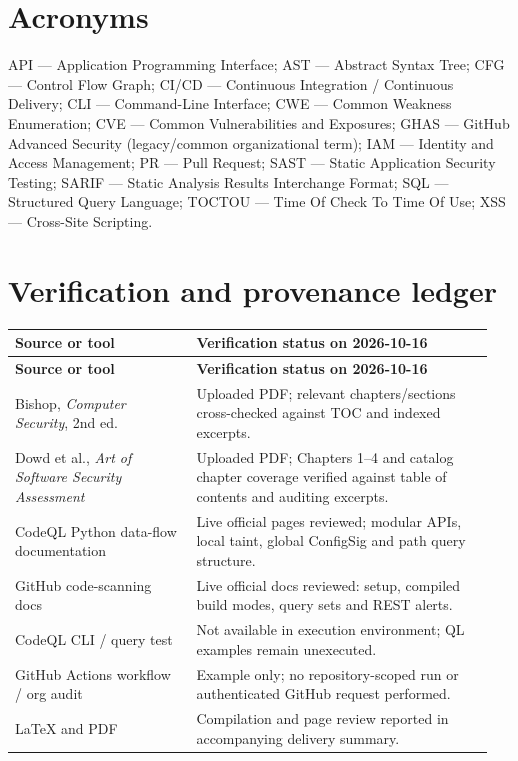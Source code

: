 \documentclass[11pt,letterpaper,oneside]{book}
\begin{document}
\section{Acronyms}

API --- Application Programming Interface; AST --- Abstract Syntax Tree; CFG --- Control Flow Graph; CI/CD --- Continuous Integration / Continuous Delivery; CLI --- Command-Line Interface; CWE --- Common Weakness Enumeration; CVE --- Common Vulnerabilities and Exposures; GHAS --- GitHub Advanced Security (legacy/common organizational term); IAM --- Identity and Access Management; PR --- Pull Request; SAST --- Static Application Security Testing; SARIF --- Static Analysis Results Interchange Format; SQL --- Structured Query Language; TOCTOU --- Time Of Check To Time Of Use; XSS --- Cross-Site Scripting.

\section{Verification and provenance ledger}

\small
\setlength{\tabcolsep}{2pt}
\renewcommand{\arraystretch}{1.18}
\begin{longtable}{>{\raggedright\arraybackslash}p{0.36\linewidth}>{\raggedright\arraybackslash}p{0.59\linewidth}}
\toprule
\textbf{Source or tool} & \textbf{Verification status on 2026-10-16}\\
\midrule
\endfirsthead
\toprule
\textbf{Source or tool} & \textbf{Verification status on 2026-10-16}\\
\midrule
\endhead
Bishop, \emph{Computer Security}, 2nd ed. & Uploaded PDF; relevant chapters/sections cross-checked against TOC and indexed excerpts.\\
Dowd et al., \emph{Art of Software Security Assessment} & Uploaded PDF; Chapters 1--4 and catalog chapter coverage verified against table of contents and auditing excerpts.\\
CodeQL Python data-flow documentation & Live official pages reviewed; modular APIs, local taint, global ConfigSig and path query structure.\\
GitHub code-scanning docs & Live official docs reviewed: setup, compiled build modes, query sets and REST alerts.\\
CodeQL CLI / query test & Not available in execution environment; QL examples remain unexecuted.\\
GitHub Actions workflow / org audit & Example only; no repository-scoped run or authenticated GitHub request performed.\\
LaTeX and PDF & Compilation and page review reported in accompanying delivery summary.\\
\bottomrule
\end{longtable}
\normalsize
\end{document}
